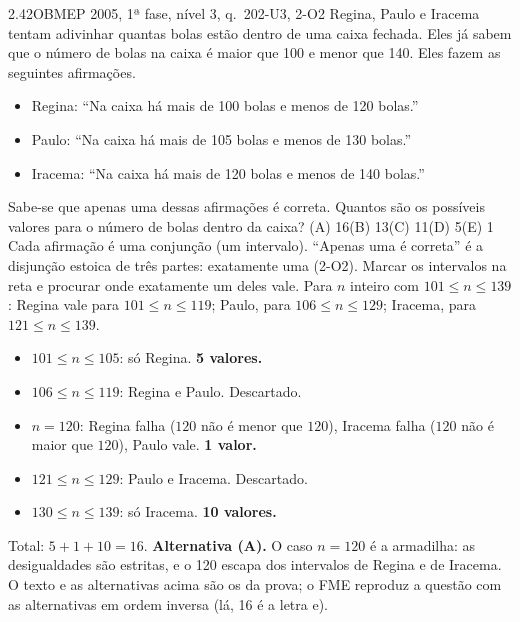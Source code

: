 \begin{exemplo}{2.4}{2}{OBMEP 2005, 1ª fase, nível 3, q.~20}{2-U3, 2-O2}\label{ex:2.4}
Regina, Paulo e Iracema tentam adivinhar quantas bolas estão dentro de uma caixa fechada. Eles já sabem que o número de bolas na caixa é maior que 100 e menor que 140. Eles fazem as seguintes afirmações.
\begin{itemize}
  \item Regina: \enquote{Na caixa há mais de 100 bolas e menos de 120 bolas.}
  \item Paulo: \enquote{Na caixa há mais de 105 bolas e menos de 130 bolas.}
  \item Iracema: \enquote{Na caixa há mais de 120 bolas e menos de 140 bolas.}
\end{itemize}
Sabe-se que apenas uma dessas afirmações é correta. Quantos são os possíveis valores para o número de bolas dentro da caixa?\quad
(A) 16\quad (B) 13\quad (C) 11\quad (D) 5\quad (E) 1
\plano Cada afirmação é uma conjunção (um intervalo). \enquote{Apenas uma é correta} é a disjunção estoica de três partes: exatamente uma (2-O2). Marcar os intervalos na reta e procurar onde exatamente um deles vale.
\resolucao
Para $n$ inteiro com $101\le n\le 139$: Regina vale para $101\le n\le119$; Paulo, para $106\le n\le129$; Iracema, para $121\le n\le139$.
\begin{itemize}
  \item $101\le n\le105$: só Regina. \textbf{5 valores.}
  \item $106\le n\le119$: Regina e Paulo. Descartado.
  \item $n=120$: Regina falha ($120$ não é menor que $120$), Iracema falha ($120$ não é maior que $120$), Paulo vale. \textbf{1 valor.}
  \item $121\le n\le129$: Paulo e Iracema. Descartado.
  \item $130\le n\le139$: só Iracema. \textbf{10 valores.}
\end{itemize}
Total: $5+1+10=16$. \textbf{Alternativa (A).}
\comentario O caso $n=120$ é a armadilha: as desigualdades são estritas, e o 120 escapa dos intervalos de Regina e de Iracema. O texto e as alternativas acima são os da prova; o FME reproduz a questão com as alternativas em ordem inversa (lá, 16 é a letra e).
\end{exemplo}

